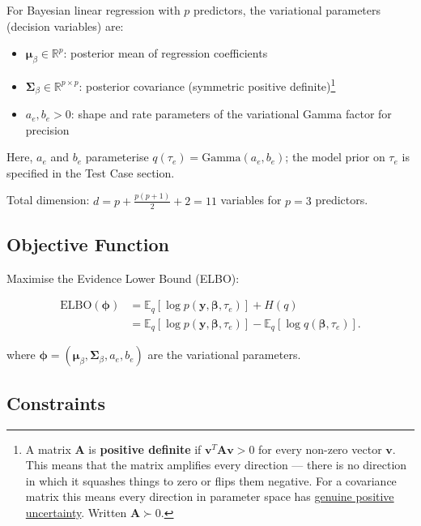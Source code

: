 \documentclass[11pt,a4paper]{article}
\newcommand{\E}{\mathbb{E}}
\newcommand{\R}{\mathbb{R}}
\newcommand{\ELBO}{\text{ELBO}}
\begin{document}
For Bayesian linear regression with $p$ predictors, the variational parameters (decision variables) are:
\begin{itemize}
\item $\bm{\mu}_\beta \in \R^p$: posterior mean of regression coefficients
\item $\bm{\Sigma}_\beta \in \R^{p \times p}$: posterior covariance 
(symmetric positive definite)\footnote{A matrix $\bm{A}$ is \textbf{positive definite} 
if $\bm{v}^T\bm{A}\bm{v} > 0$ for every non-zero vector $\bm{v}$. This means that the matrix amplifies every 
direction --- there is no direction in which it squashes things to zero or flips them negative. For a
 covariance matrix this means every direction in parameter space has \underline{genuine positive uncertainty}. 
 Written $\bm{A} \succ 0$.}
\item $a_e, b_e > 0$: shape and rate parameters of the variational Gamma factor for precision
\end{itemize}

Here, $a_e$ and $b_e$ parameterise $q(\tau_e)=\mathrm{Gamma}(a_e,b_e)$; 
the model prior on $\tau_e$ is specified in the Test Case section.  \vspace{1em} 

Total dimension: $d = p + \frac{p(p+1)}{2} + 2 = 11$ variables for $p=3$ predictors.

\subsection*{Objective Function}

Maximise the Evidence Lower Bound (ELBO):

\begin{align}
\ELBO(\bm{\phi})
&= \E_q[\log p(\bm{y}, \bm{\beta}, \tau_e)] + H(q) \\
&= \E_q[\log p(\bm{y}, \bm{\beta}, \tau_e)] - \E_q[\log q(\bm{\beta}, \tau_e)] .
\end{align}

where $\bm{\phi} = (\bm{\mu}_\beta, \bm{\Sigma}_\beta, a_e, b_e)$ are the variational parameters.

\subsection*{Constraints}
\end{document}

